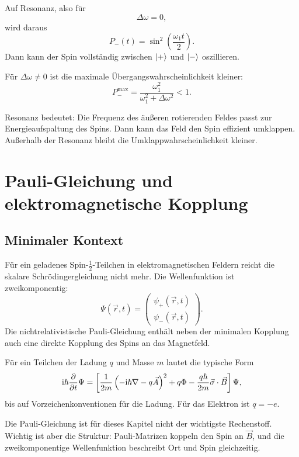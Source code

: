 Auf Resonanz, also für
\[
    \Delta\omega=0,
\]
wird daraus
\[
    P_-(t)=\sin^2\left(\frac{\omega_1t}{2}\right).
\]
Dann kann der Spin vollständig zwischen \(\left|+\right\rangle\) und \(\left|-\right\rangle\) oszillieren.

Für \(\Delta\omega\ne0\) ist die maximale Übergangswahrscheinlichkeit kleiner:
\[
    P_-^{\max}=\frac{\omega_1^2}{\omega_1^2+\Delta\omega^2}<1.
\]

\begin{conceptbox}
Resonanz bedeutet: Die Frequenz des äußeren rotierenden Feldes passt zur Energieaufspaltung des Spins. Dann kann das Feld den Spin effizient umklappen. Außerhalb der Resonanz bleibt die Umklappwahrscheinlichkeit kleiner.
\end{conceptbox}

\section{Pauli-Gleichung und elektromagnetische Kopplung}

\subsection{Minimaler Kontext}

Für ein geladenes Spin-\(\frac12\)-Teilchen in elektromagnetischen Feldern reicht die skalare Schrödingergleichung nicht mehr. Die Wellenfunktion ist zweikomponentig:
\[
    \Psi(\vec r,t)=
    \begin{pmatrix}
        \psi_+(\vec r,t)\\
        \psi_-(\vec r,t)
    \end{pmatrix}.
\]
Die nichtrelativistische Pauli-Gleichung enthält neben der minimalen Kopplung auch eine direkte Kopplung des Spins an das Magnetfeld.

Für ein Teilchen der Ladung \(q\) und Masse \(m\) lautet die typische Form
\[
    \mathrm{i}\hbar\frac{\partial}{\partial t}\Psi
    =\left[
        \frac{1}{2m}\left(-\mathrm{i}\hbar\nabla-q\vec A\right)^2
        +q\Phi
        -\frac{q\hbar}{2m}\vec\sigma\cdot\vec B
    \right]\Psi,
\]
bis auf Vorzeichenkonventionen für die Ladung. Für das Elektron ist \(q=-e\).

\begin{notebox}
Die Pauli-Gleichung ist für dieses Kapitel nicht der wichtigste Rechenstoff. Wichtig ist aber die Struktur: Pauli-Matrizen koppeln den Spin an \(\vec B\), und die zweikomponentige Wellenfunktion beschreibt Ort und Spin gleichzeitig.
\end{notebox}

